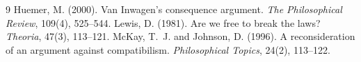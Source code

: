 \documentclass{situationist-preprint}
\begin{document}
\begin{thebibliography}{9}
 Huemer, M. (2000). Van Inwagen's consequence argument. \emph{The Philosophical Review}, 109(4), 525--544.
 Lewis, D. (1981). Are we free to break the laws? \emph{Theoria}, 47(3), 113--121.
 McKay, T.~J. and Johnson, D. (1996). A reconsideration of an argument against compatibilism. \emph{Philosophical Topics}, 24(2), 113--122.
\end{thebibliography}
\end{document}
